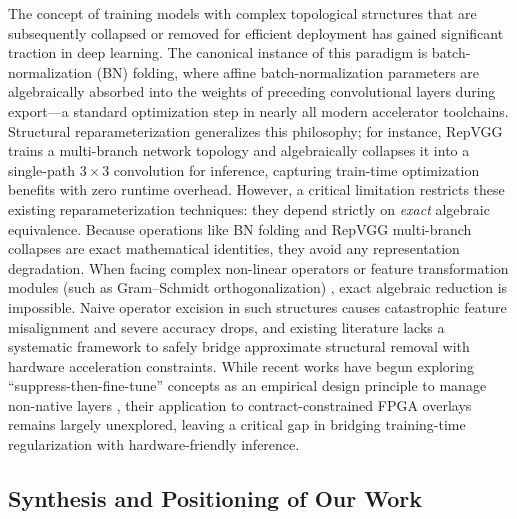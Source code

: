 \documentclass[algorithms,article,submit,moreauthors]{Definitions/mdpi}
\begin{document}
The concept of training models with complex topological structures that are subsequently collapsed or removed for efficient deployment has gained significant traction in deep learning. The canonical instance of this paradigm is batch-normalization (BN) folding, where affine batch-normalization parameters are algebraically absorbed into the weights of preceding convolutional layers during export—a standard optimization step in nearly all modern accelerator toolchains. Structural reparameterization generalizes this philosophy; for instance, RepVGG \citep{bib16} trains a multi-branch network topology and algebraically collapses it into a single-path $3{\times}3$ convolution for inference, capturing train-time optimization benefits with zero runtime overhead. However, a critical limitation restricts these existing reparameterization techniques: they depend strictly on \emph{exact} algebraic equivalence. Because operations like BN folding and RepVGG multi-branch collapses are exact mathematical identities, they avoid any representation degradation. When facing complex non-linear operators or feature transformation modules (such as Gram--Schmidt orthogonalization) \citep{bibsoftortho}, exact algebraic reduction is impossible. Naive operator excision in such structures causes catastrophic feature misalignment and severe accuracy drops, and existing literature lacks a systematic framework to safely bridge approximate structural removal with hardware acceleration constraints. While recent works have begun exploring ``suppress-then-fine-tune'' concepts as an empirical design principle to manage non-native layers \citep{bib17}, their application to contract-constrained FPGA overlays remains largely unexplored, leaving a critical gap in bridging training-time regularization with hardware-friendly inference.

\subsection{Synthesis and Positioning of Our Work}
\end{document}
